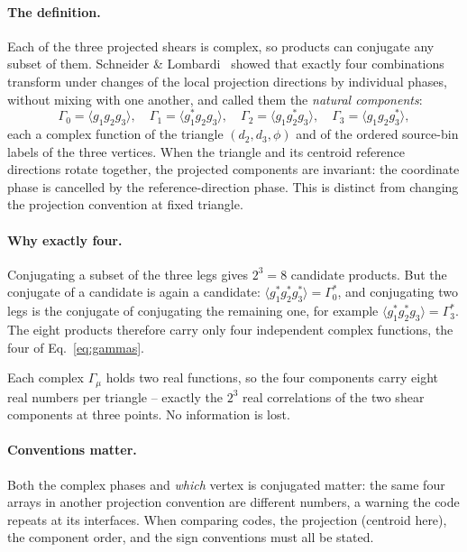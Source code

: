 \documentclass[11pt]{article}
\numberwithin{equation}{section}
\begin{document}
\paragraph{The definition.}
Each of the three projected shears is complex, so products can
conjugate any subset of them.  Schneider \&
Lombardi~\cite{SchneiderLombardi} showed that exactly four
combinations transform under changes of the local projection directions
by individual phases, without mixing with one another, and called them
the \emph{natural components}:
\begin{equation}
  \Gamma_0 = \bigl\langle g_1 g_2 g_3 \bigr\rangle, \quad
  \Gamma_1 = \bigl\langle g_1^{*} g_2 g_3 \bigr\rangle, \quad
  \Gamma_2 = \bigl\langle g_1 g_2^{*} g_3 \bigr\rangle, \quad
  \Gamma_3 = \bigl\langle g_1 g_2 g_3^{*} \bigr\rangle ,
  \label{eq:gammas}
\end{equation}
each a complex function of the triangle $(d_2, d_3, \phi)$ and of
the ordered source-bin labels of the three vertices. When the triangle
and its centroid reference directions rotate together, the projected
components are invariant: the coordinate phase is cancelled by the
reference-direction phase. This is distinct from changing the projection
convention at fixed triangle.

\paragraph{Why exactly four.}
Conjugating a subset of the three legs gives $2^3 = 8$ candidate
products.  But the conjugate of a candidate is again a candidate:
$\langle g_1^* g_2^* g_3^*\rangle = \Gamma_0^*$, and conjugating two
legs is the conjugate of conjugating the remaining one, for example
$\langle g_1^* g_2^* g_3\rangle = \Gamma_3^*$.  The eight products
therefore carry only four independent complex functions, the four of
Eq.~\eqref{eq:gammas}.

Each complex $\Gamma_\mu$ holds two real functions, so the four
components carry eight real numbers per triangle -- exactly the
$2^3$ real correlations of the two shear components at three
points.  No information is lost.

\paragraph{Conventions matter.}
Both the complex phases and \emph{which} vertex is conjugated
matter: the same four arrays in another projection convention are
different numbers, a warning the code repeats at its interfaces.
When comparing codes, the projection (centroid here), the component
order, and the sign conventions must all be stated.
\end{document}
